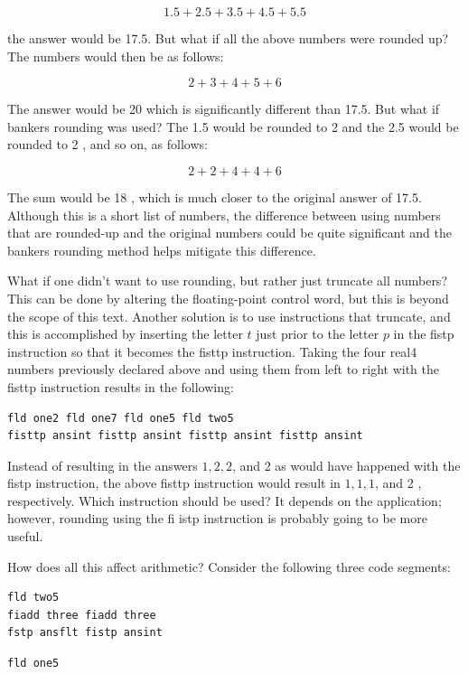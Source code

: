 \documentclass[10pt]{book}
\begin{document}
$$
1.5+2.5+3.5+4.5+5.5
$$

the answer would be 17.5. But what if all the above numbers were rounded up? The numbers would then be as follows:

$$
2+3+4+5+6
$$

The answer would be 20 which is significantly different than 17.5. But what if bankers rounding was used? The 1.5 would be rounded to 2 and the 2.5 would be rounded to 2 , and so on, as follows:

$$
2+2+4+4+6
$$

The sum would be 18 , which is much closer to the original answer of 17.5. Although this is a short list of numbers, the difference between using numbers that are rounded-up and the original numbers could be quite significant and the bankers rounding method helps mitigate this difference.

What if one didn't want to use rounding, but rather just truncate all numbers? This can be done by altering the floating-point control word, but this is beyond the scope of this text. Another solution is to use instructions that truncate, and this is accomplished by inserting the letter $t$ just prior to the letter $p$ in the fistp instruction so that it becomes the fisttp instruction. Taking the four real4 numbers previously declared above and using them from left to right with the fisttp instruction results in the following:


\begin{verbatim}
fld one2 fld one7 fld one5 fld two5
fisttp ansint fisttp ansint fisttp ansint fisttp ansint
\end{verbatim}

Instead of resulting in the answers $1,2,2$, and 2 as would have happened with the fistp instruction, the above fisttp instruction would result in $1,1,1$, and 2 , respectively. Which instruction should be used? It depends on the application; however, rounding using the fi istp instruction is probably going to be more useful.

How does all this affect arithmetic? Consider the following three code segments:

\begin{verbatim}
fld two5
fiadd three fiadd three
fstp ansflt fistp ansint
\end{verbatim}

\begin{verbatim}
fld one5
\end{verbatim}
\end{document}
